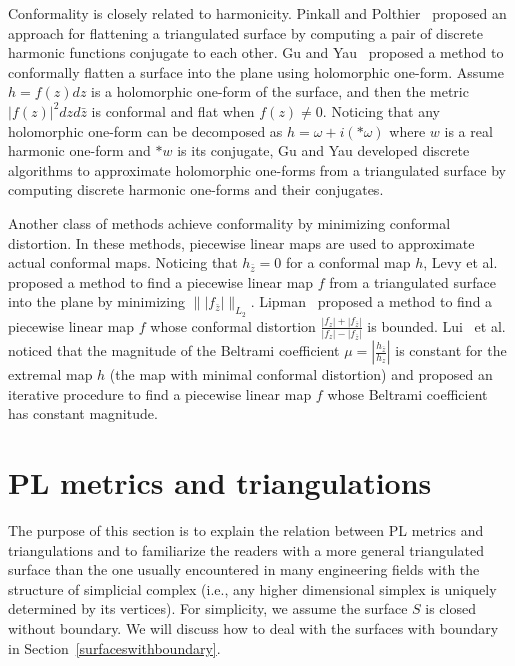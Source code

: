 \documentclass[11pt]{article}
\begin{document}
Conformality is closely related to harmonicity. Pinkall and Polthier~\cite{pinkall} proposed
an approach for flattening a triangulated surface by computing a pair of 
discrete harmonic functions conjugate to each other. 
Gu and Yau~\cite{Gu:2003} proposed a method to conformally flatten a surface
into the plane using holomorphic one-form. Assume $h=f(z)dz$ is a 
holomorphic one-form of the surface, and then the metric 
$|f(z)|^2 dz d\bar{z}$ is conformal and flat when $f(z) \neq 0$. 
Noticing that any holomorphic one-form can be decomposed as 
$h = \omega + i(*\omega)$ where $w$ is a real harmonic one-form and 
$*w$ is its conjugate, Gu and Yau developed discrete algorithms
to approximate holomorphic one-forms from a triangulated surface by 
computing discrete harmonic one-forms and their conjugates. 


Another class of methods achieve conformality by minimizing conformal distortion. 
In these methods, piecewise linear maps are used to approximate actual conformal maps. 
Noticing that $h_{\bar{z}} = 0$ for a conformal map $h$, 
Levy et al.~\cite{Levy} proposed a method to find a piecewise linear map $f$ from a 
triangulated surface into the plane by minimizing $\|| f_{\bar{z}}|\|_{L_2}$. 
Lipman~\cite{Lipman12} proposed a method to find a piecewise linear map $f$ whose
conformal distortion $\frac{|f_z|+|f_{\bar{z}}|}{|f_z|-|f_{\bar{z}}|}$ is bounded. 
Lui~\cite{Lui} et al. noticed that the magnitude of the Beltrami coefficient 
$\mu = \left |\frac{h_{\bar{z}}}{h_z}\right|$ is constant for the extremal map $h$ 
(the map with minimal conformal distortion) and proposed an iterative procedure 
to find a piecewise linear map $f$ whose Beltrami coefficient has constant magnitude. 



\section{PL metrics and triangulations}
The purpose of this section is to explain the relation between
PL metrics and triangulations and to familiarize the readers with a more
general triangulated surface than the one usually encountered
in many engineering fields with the structure of simplicial complex (i.e., 
any higher dimensional simplex is uniquely determined by its vertices). 
For simplicity, we assume the surface $S$ is closed without boundary. 
We will discuss how to deal with the 
surfaces with boundary in Section~\ref{surfaceswithboundary}. 
\end{document}
